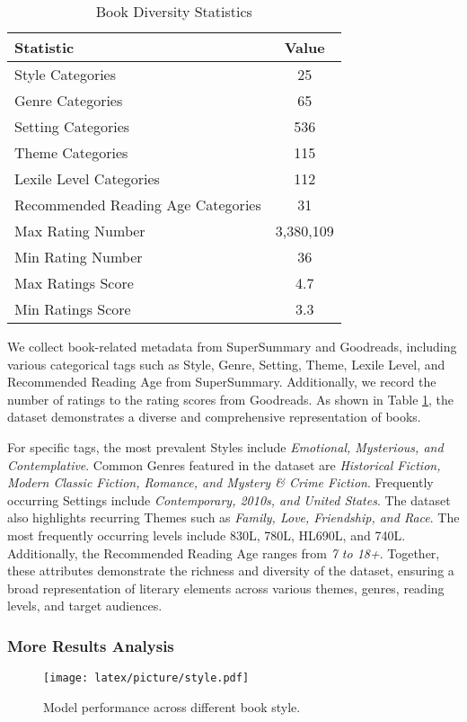 \begin{table}[h]
\centering
\small
\begin{tabular}{lc}
\toprule
Statistic & Value \\
\midrule
Style Categories & 25 \\
Genre Categories & 65 \\
Setting Categories & 536 \\
Theme Categories & 115 \\
Lexile Level Categories & 112 \\
Recommended Reading Age Categories & 31 \\
Max Rating Number & 3,380,109 \\
Min Rating Number & 36 \\
Max Ratings Score & 4.7 \\
Min Ratings Score & 3.3 \\
\bottomrule
\end{tabular}
\caption{Book Diversity Statistics}
\label{tab:book_diversity} %
\end{table}

We collect book-related metadata from SuperSummary and Goodreads, including various categorical tags such as Style, Genre, Setting, Theme, Lexile Level, and Recommended Reading Age from SuperSummary. 
Additionally, we record the number of ratings to the rating scores from Goodreads. 
As shown in Table \ref{tab:book_diversity}, the dataset demonstrates a diverse and comprehensive representation of books.

For specific tags, the most prevalent Styles include \textit{Emotional, Mysterious, and Contemplative}. 
Common Genres featured in the dataset are \textit{Historical Fiction, Modern Classic Fiction, Romance, and Mystery \& Crime Fiction}. 
Frequently occurring Settings include \textit{Contemporary, 2010s, and United States}. 
The dataset also highlights recurring Themes such as \textit{Family, Love, Friendship, and Race}. 
The most frequently occurring levels include 830L, 780L, HL690L, and 740L.
Additionally, the Recommended Reading Age ranges from \textit{7 to 18+}.
Together, these attributes demonstrate the richness and diversity of the dataset, ensuring a broad representation of literary elements across various themes, genres, reading levels, and target audiences.

\subsubsection{More Results Analysis}
\label{sec:app_result}
\begin{figure*}[h]
    \centering
    \texttt{[image: latex/picture/style.pdf]}
    \caption{Model performance across different book style.}
    \label{fig:style}
\end{figure*}

